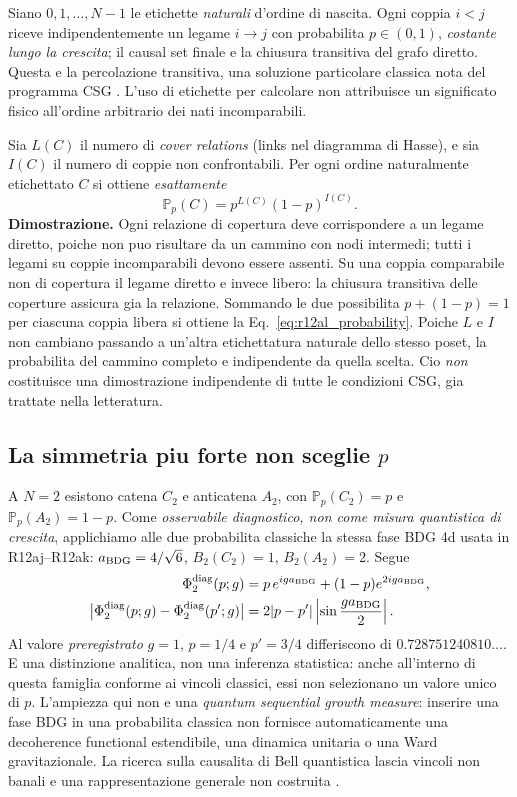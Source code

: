 \documentclass[11pt,a4paper]{article}
\begin{document}
Siano $0,1,\ldots,N-1$ le etichette \emph{naturali} d'ordine di nascita. Ogni coppia $i<j$ riceve indipendentemente un legame $i\to j$ con probabilita $p\in(0,1)$, \emph{costante lungo la crescita}; il causal set finale e la chiusura transitiva del grafo diretto. Questa e la percolazione transitiva, una soluzione particolare classica nota del programma CSG \cite{RideoutSorkin2000}. L'uso di etichette per calcolare non attribuisce un significato fisico all'ordine arbitrario dei nati incomparabili.

Sia $L(C)$ il numero di \emph{cover relations} (links nel diagramma di Hasse), e sia $I(C)$ il numero di coppie non confrontabili. Per ogni ordine naturalmente etichettato $C$ si ottiene \emph{esattamente}
\begin{equation}
 \mathbb P_p(C)=p^{L(C)}(1-p)^{I(C)}.
 \label{eq:r12al_probability}
\end{equation}
\textbf{Dimostrazione.} Ogni relazione di copertura deve corrispondere a un legame diretto, poiche non puo risultare da un cammino con nodi intermedi; tutti i legami su coppie incomparabili devono essere assenti. Su una coppia comparabile non di copertura il legame diretto e invece libero: la chiusura transitiva delle coperture assicura gia la relazione. Sommando le due possibilita $p+(1-p)=1$ per ciascuna coppia libera si ottiene la Eq.~\eqref{eq:r12al_probability}. Poiche $L$ e $I$ non cambiano passando a un'altra etichettatura naturale dello stesso poset, la probabilita del cammino completo e indipendente da quella scelta. Cio \emph{non} costituisce una dimostrazione indipendente di tutte le condizioni CSG, gia trattate nella letteratura.

\subsection{La simmetria piu forte non sceglie $p$}

A $N=2$ esistono catena $C_2$ e anticatena $A_2$, con $\mathbb P_p(C_2)=p$ e $\mathbb P_p(A_2)=1-p$. Come \emph{osservabile diagnostico, non come misura quantistica di crescita}, applichiamo alle due probabilita classiche la stessa fase BDG 4d usata in R12aj--R12ak: $a_{\rm BDG}=4/\sqrt6$, $B_2(C_2)=1$, $B_2(A_2)=2$. Segue
\begin{align}
 \Phi^{\rm diag}_2(p;g)&=p\,e^{iga_{\rm BDG}}+(1-p)e^{2iga_{\rm BDG}},\\
 \bigl|\Phi^{\rm diag}_2(p;g)-\Phi^{\rm diag}_2(p';g)\bigr|
 &=2|p-p'|\left|\sin\frac{ga_{\rm BDG}}2\right|.
 \label{eq:r12al_nonunique}
\end{align}
Al valore \emph{preregistrato} $g=1$, $p=1/4$ e $p'=3/4$ differiscono di $0.728751240810\ldots$. E una distinzione analitica, non una inferenza statistica: anche all'interno di questa famiglia conforme ai vincoli classici, essi non selezionano un valore unico di $p$. L'ampiezza qui non e una \emph{quantum sequential growth measure}: inserire una fase BDG in una probabilita classica non fornisce automaticamente una decoherence functional estendibile, una dinamica unitaria o una Ward gravitazionale. La ricerca sulla causalita di Bell quantistica lascia vincoli non banali e una rappresentazione generale non costruita \cite{SrivastavaSurya2026}.
\end{document}
